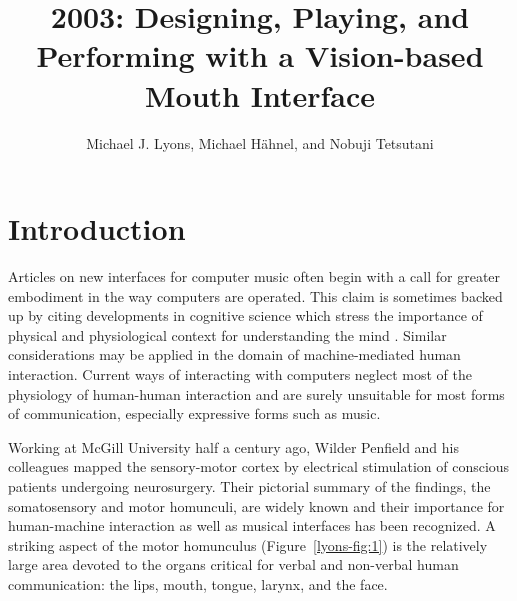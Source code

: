 
\graphicspath{  {mainmatter/Lyons_2003/} }
\title*{2003: Designing, Playing, and Performing with a Vision-based Mouth Interface}

\author{Michael J. Lyons, Michael H{\"a}hnel, and Nobuji Tetsutani}

%
%
\maketitle




\section{Introduction}
Articles on new interfaces for computer music often begin with a call for greater embodiment in the way computers are operated. This claim is sometimes backed up by citing developments in cognitive science which stress the importance of physical and physiological context for understanding the mind \cite{Varela:1992}. Similar considerations may be applied in the domain of   machine-mediated human interaction. Current ways of interacting with computers neglect most of the physiology of human-human interaction and are surely unsuitable for most forms of communication, especially expressive forms such as music.

Working at McGill University half a century ago, Wilder Penfield and his colleagues \cite{Penfield:1950} mapped the sensory-motor cortex by electrical stimulation of conscious patients undergoing neurosurgery. Their pictorial summary of the findings, the somatosensory and motor homunculi, are widely known and their importance for human-machine interaction \cite{Card:1991}as well as musical interfaces \cite{Gillespie:1999} has been recognized. A striking aspect of the motor homunculus (Figure~\ref{lyons-fig:1}) is the relatively large area devoted to the organs critical for verbal and non-verbal human communication: the lips, mouth, tongue, larynx, and the face.

